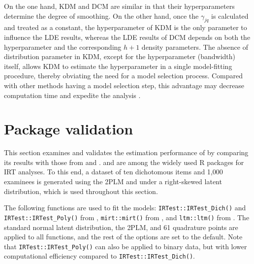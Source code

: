On the one hand, KDM and DCM are similar in that their
hyperparameters determine the degree of smoothing. On the other hand,
once the \(\gamma_{jq}\) is calculated and treated as a constant, the
hyperparameter of KDM is the only parameter to influence the LDE results,
whereas the LDE results of DCM depends on both the hyperparameter and
the corresponding \(h+1\) density parameters. The absence of distribution
parameter in KDM, except for the hyperparameter (bandwidth) itself,
allows KDM to estimate the hyperparameter in a single
model-fitting procedure, thereby obviating the need for a model
selection process. Compared with other methods having a model selection
step, this advantage may decrease computation time and expedite the
analysis \citep{Li:2022}.

\hypertarget{package-validation}{%
\section{Package validation}\label{package-validation}}

This section examines and validates the estimation performance of
 by comparing its results with those from
 \citep{mirt} and  \citep{ltm}.  and
 are among the widely used R packages for IRT analyses. To this end,
a dataset of ten dichotomous items and 1,000 examinees is
generated using the 2PLM and under a right-skewed latent distribution,
which is used throughout this section.

The following functions are used to fit the models: \texttt{IRTest::IRTest\_Dich()} and
\texttt{IRTest::IRTest\_Poly()} from , \texttt{mirt::mirt()} from , and
\texttt{ltm::ltm()} from . The standard normal latent distribution, the 2PLM, and
61 quadrature points are applied to all functions, and the rest of the
options are set to the default. Note that \texttt{IRTest::IRTest\_Poly()} can also be
applied to binary data, but with lower computational efficiency compared to
\texttt{IRTest::IRTest\_Dich()}.

